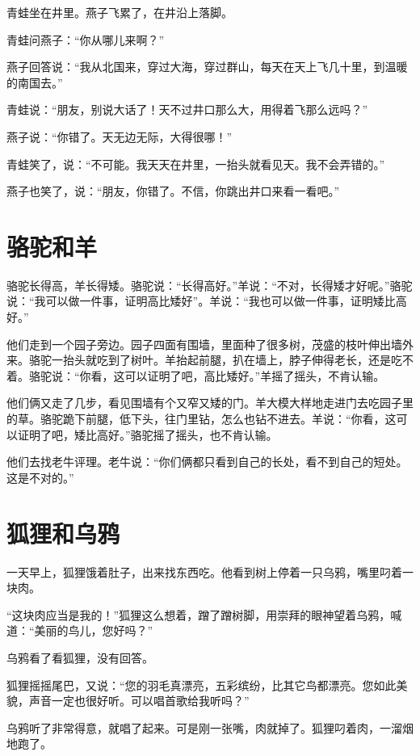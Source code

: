\documentclass[12pt,UTF-8,openany]{ctexbook}
\begin{document}
\begin{large}
    
    青蛙坐在井里。燕子飞累了，在井沿上落脚。
    
    青蛙问燕子：“你从哪儿来啊？”
    
    燕子回答说：“我从北国来，穿过大海，穿过群山，每天在天上飞几十里，到温暖的南国去。”
    
    青蛙说：“朋友，别说大话了！天不过井口那么大，用得着飞那么远吗？”
    
    燕子说：“你错了。天无边无际，大得很哪！”
    
    青蛙笑了，说：“不可能。我天天在井里，一抬头就看见天。我不会弄错的。”
    
    燕子也笑了，说：“朋友，你错了。不信，你跳出井口来看一看吧。”
    
\end{large}



\chapter{骆驼和羊}

\begin{large}
    
    骆驼长得高，羊长得矮。骆驼说：“长得高好。”羊说：“不对，长得矮才好呢。”骆驼说：“我可以做一件事，证明高比矮好”。羊说：“我也可以做一件事，证明矮比高好。”
    
    他们走到一个园子旁边。园子四面有围墙，里面种了很多树，茂盛的枝叶伸出墙外来。骆驼一抬头就吃到了树叶。羊抬起前腿，扒在墙上，脖子伸得老长，还是吃不着。骆驼说：“你看，这可以证明了吧，高比矮好。”羊摇了摇头，不肯认输。
    
    他们俩又走了几步，看见围墙有个又窄又矮的门。羊大模大样地走进门去吃园子里的草。骆驼跪下前腿，低下头，往门里钻，怎么也钻不进去。羊说：“你看，这可以证明了吧，矮比高好。”骆驼摇了摇头，也不肯认输。
    
    他们去找老牛评理。老牛说：“你们俩都只看到自己的长处，看不到自己的短处。这是不对的。”
    
\end{large}



\chapter{狐狸和乌鸦}

\begin{large}
    
    一天早上，狐狸饿着肚子，出来找东西吃。他看到树上停着一只乌鸦，嘴里叼着一块肉。
    
    “这块肉应当是我的！”狐狸这么想着，蹭了蹭树脚，用崇拜的眼神望着乌鸦，喊道：“美丽的鸟儿，您好吗？”
    
    乌鸦看了看狐狸，没有回答。
    
    狐狸摇摇尾巴，又说：“您的羽毛真漂亮，五彩缤纷，比其它鸟都漂亮。您如此美貌，声音一定也很好听。可以唱首歌给我听吗？”
    
    乌鸦听了非常得意，就唱了起来。可是刚一张嘴，肉就掉了。狐狸叼着肉，一溜烟地跑了。
    
\end{large}
\end{document}
